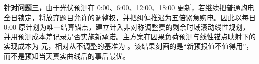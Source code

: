
\textbf{针对问题三，}由于光伏预测在 0:00、6:00、12:00、18:00 更新，若继续把普通购电全日锁定，将放弃题目允许的调整权，并把纠偏推迟为五倍紧急购电。因此以每日 0:00 原计划为唯一结算锚点，建立计入非对称调整费的剩余时域滚动线性规划，并用预测成本差记录是否实施新承诺。主方案在因果负荷预测与线性锚点映射下的实现成本为 \QThreeMainCost 元，相对从不调整的基准为 \QThreeSavePct。该结果刻画的是“新预报值不值得用”，而不是预知当天真实曲线后的事后最优。
